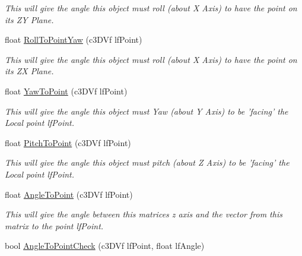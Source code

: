 \begin{DoxyCompactItemize}
\begin{DoxyCompactList}\small\item\em This will give the angle this object must roll (about X Axis) to have the point on its ZY Plane. \end{DoxyCompactList}\item 
\hypertarget{classc_matrix4_a345d305007ab54ff0d1efcb08ef225de}{
float \hyperlink{classc_matrix4_a345d305007ab54ff0d1efcb08ef225de}{RollToPointYaw} (c3DVf lfPoint)}
\label{classc_matrix4_a345d305007ab54ff0d1efcb08ef225de}

\begin{DoxyCompactList}\small\item\em This will give the angle this object must roll (about X Axis) to have the point on its ZX Plane. \end{DoxyCompactList}\item 
\hypertarget{classc_matrix4_a9722060886042fea5579a9dd7e0be915}{
float \hyperlink{classc_matrix4_a9722060886042fea5579a9dd7e0be915}{YawToPoint} (c3DVf lfPoint)}
\label{classc_matrix4_a9722060886042fea5579a9dd7e0be915}

\begin{DoxyCompactList}\small\item\em This will give the angle this object must Yaw (about Y Axis) to be 'facing' the Local point lfPoint. \end{DoxyCompactList}\item 
\hypertarget{classc_matrix4_a2a2f83b86dccf8996b0689e1ca22f932}{
float \hyperlink{classc_matrix4_a2a2f83b86dccf8996b0689e1ca22f932}{PitchToPoint} (c3DVf lfPoint)}
\label{classc_matrix4_a2a2f83b86dccf8996b0689e1ca22f932}

\begin{DoxyCompactList}\small\item\em This will give the angle this object must pitch (about Z Axis) to be 'facing' the Local point lfPoint. \end{DoxyCompactList}\item 
\hypertarget{classc_matrix4_a9c1be26ade96fbcd300fe048ad1b2d36}{
float \hyperlink{classc_matrix4_a9c1be26ade96fbcd300fe048ad1b2d36}{AngleToPoint} (c3DVf lfPoint)}
\label{classc_matrix4_a9c1be26ade96fbcd300fe048ad1b2d36}

\begin{DoxyCompactList}\small\item\em This will give the angle between this matrices z axis and the vector from this matrix to the point lfPoint. \end{DoxyCompactList}\item 
\hypertarget{classc_matrix4_abcc06bf2acc43d27b434d7ef993ca29e}{
bool \hyperlink{classc_matrix4_abcc06bf2acc43d27b434d7ef993ca29e}{AngleToPointCheck} (c3DVf lfPoint, float lfAngle)}
\label{classc_matrix4_abcc06bf2acc43d27b434d7ef993ca29e}


\end{DoxyCompactItemize}

